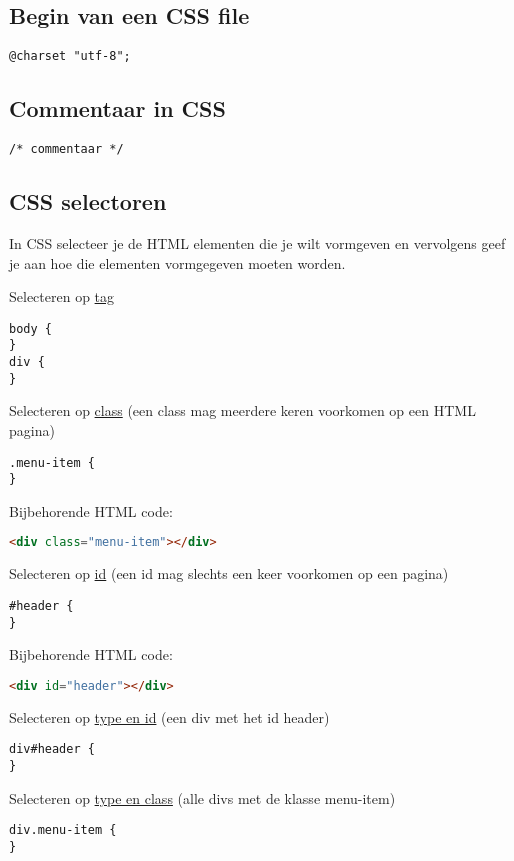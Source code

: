 \documentclass[8pt,pagesize,footinclude=false,headinclude=false]{scrartcl}
\begin{document}
\begin{multicols*}{4}
\subsection*{Begin van een CSS file}
\begin{lstlisting}
@charset "utf-8";
\end{lstlisting}

\subsection*{Commentaar in CSS}
\begin{lstlisting}
/* commentaar */
\end{lstlisting}

\subsection*{CSS selectoren}
In CSS selecteer je de HTML elementen die je wilt vormgeven en vervolgens geef je aan hoe die elementen vormgegeven moeten worden.

\noindent Selecteren op \underline{tag}
\begin{lstlisting}
body {
}
div {
}
\end{lstlisting}

\noindent Selecteren op \underline{class} (een class mag meerdere keren voorkomen op een HTML pagina)
\begin{lstlisting}
.menu-item {
}
\end{lstlisting}
\noindent Bijbehorende HTML code:
\begin{lstlisting}[language=HTML]
<div class="menu-item"></div>
\end{lstlisting}

\noindent Selecteren op \underline{id} (een id mag slechts een keer voorkomen op een pagina)
\begin{lstlisting}
#header {
}
\end{lstlisting}
\noindent Bijbehorende HTML code:
\begin{lstlisting}[language=HTML]
<div id="header"></div>
\end{lstlisting}

\noindent Selecteren op \underline{type en id} (een div met het id header)
\begin{lstlisting}
div#header {
}
\end{lstlisting}

\noindent Selecteren op \underline{type en class} (alle divs met de klasse menu-item)
\begin{lstlisting}
div.menu-item {
}
\end{lstlisting}


\end{multicols*}
\end{document}
